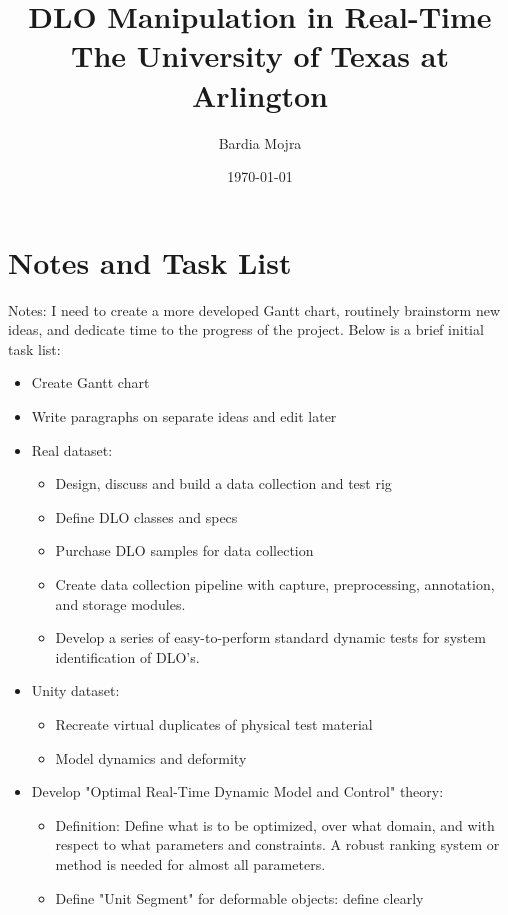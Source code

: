 \documentclass[12pt]{book}
\title{
{DLO Manipulation in Real-Time}\\
{\large The University of Texas at Arlington}\\
}
\author{Bardia Mojra}
\date{\today}
\begin{document}
% 

\chapter*{Notes and Task List}
Notes: I need to create a more developed Gantt chart,
routinely brainstorm new ideas, and dedicate time to the progress of the
project. Below is a brief initial task list:
\begin{itemize}
  \item Create Gantt chart
  \item Write paragraphs on separate ideas and edit later
      \item Real dataset:
      \begin{itemize}
            \item Design, discuss and build a data collection and test rig
            \item Define DLO classes and specs
            \item Purchase DLO samples for data collection
            \item Create data collection pipeline with capture, preprocessing,
            annotation, and storage modules.
            \item Develop a series of easy-to-perform standard dynamic tests
            for system identification of DLO's.
      \end{itemize}
      \item Unity dataset:
      \begin{itemize}
            \item Recreate virtual duplicates of physical test material
            \item Model dynamics and deformity
      \end{itemize}
      \item Develop "Optimal Real-Time Dynamic Model and Control" theory:
      \begin{itemize}
            \item Definition: Define what is to be optimized, over what domain,
            and with respect to what parameters and constraints. A robust
            ranking system or method is needed for almost all parameters.
            \item Define "Unit Segment" for deformable objects: define clearly

\end{itemize}
\end{itemize}
\end{document}
